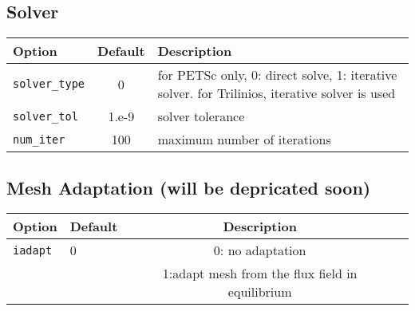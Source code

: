 \subsection{Solver}
\begin{tabular}{lcp{4in}}
  \textbf{Option}&\textbf{Default}&\textbf{Description}\\
  \hline
  \texttt{solver\_type} & 0 &  for PETSc only,  0: direct solve, 1: iterative solver.   
                               for Trilinios, iterative solver is used \\
  \texttt{solver\_tol}  & 1.e-9 & solver tolerance \\
  \texttt{num\_iter}    & 100 &   maximum number of iterations 
\end{tabular}

\subsection{Mesh Adaptation (will be depricated soon)}
\begin{tabular}{llcp{4in}}
\textbf{Option}&\textbf{Default}&\textbf{Description}\\
  \hline
 \texttt{iadapt} & 0 & 0: no adaptation \\
                 &   & 1:adapt mesh from the flux field in equilibrium
\end{tabular}


